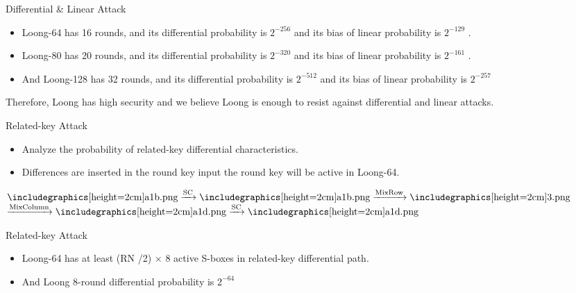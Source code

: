 \begin{frame}{Differential \& Linear Attack}
    \begin{itemize}
         \item Loong-64 has 16 rounds, and its differential probability is $2^{-256}$
and its bias of linear probability is $2^{-129}$ .\\
\pause
        \item Loong-80 has 20 rounds, and its differential probability is $2^{-320}$ and its bias
of linear probability is $2^{-161}$ .\\
\pause
        \item And Loong-128 has 32 rounds, and its differential probability is $2^{-512}$ and its bias of linear probability is $2^{-257}$
    \end{itemize}
    Therefore, Loong has high security and
we believe Loong is enough to resist against differential and
linear attacks.
\end{frame}



\begin{frame}{Related-key Attack}
    \begin{itemize}
        \item Analyze the probability of related-key differential characteristics.
        \pause
        \item Differences are inserted in the round key input the round key will be active in Loong-64.
    \end{itemize}
    \begin{center}
      $\TeaserImage{a1b.png} \xrightarrow{\text{SC}} \TeaserImage{a1b.png}
        \xrightarrow{\text{MixRow}} \TeaserImage{3.png} $
        $\xrightarrow{\text{MixColumn}}
        \TeaserImage{a1d.png} \xrightarrow{\text{SC}}\TeaserImage{a1d.png}$
    \end{center}
\end{frame}

\begin{frame}{Related-key Attack}
    \begin{itemize}
        \item Loong-64 has at least (RN /2) × 8 active S-boxes in related-key differential path.
        \pause
        \item And Loong 8-round differential probability is $2^{-64}$

    \end{itemize}
\end{frame}


